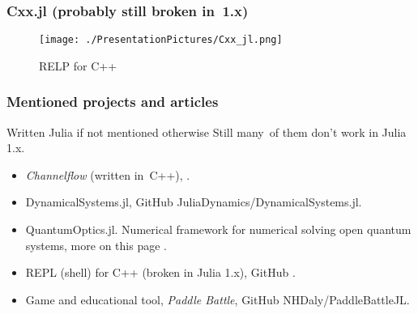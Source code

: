 \documentclass[10pt,t]{beamer}
\begin{document}
\begin{frame}
  \frametitle{Cxx.jl (probably still broken in~1.x)}


  \begin{figure}

    \centering

    \texttt{[image: ./PresentationPictures/Cxx\_jl.png]}


    \caption{RELP for C++}

  \end{figure}

\end{frame}





\begin{frame}
  \frametitle{Mentioned projects and articles}


  {Written Julia if not mentioned otherwise}
  Still many~of them don't work in Julia 1.x.
  \begin{itemize}
    \RaggedRight

  \item \textit{Channelflow} (written in~C++),
    .

  \item DynamicalSystems.jl, GitHub
    {JuliaDynamics/DynamicalSystems.jl}.

  \item QuantumOptics.jl. Numerical framework for numerical
    solving open quantum systems, more on this page
    .

  \item REPL (shell) for C++ (broken in Julia 1.x), GitHub
    .

  \item Game and educational tool, \textit{Paddle Battle}, GitHub
    {NHDaly/PaddleBattleJL}.

  \end{itemize}

\end{frame}
\end{document}
